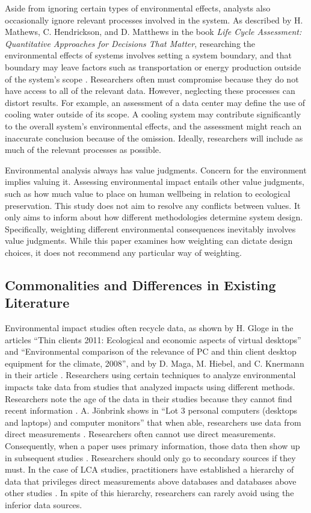 \documentclass[final,journal,10pt,letterpaper,oneside,twocolumn,compsoc]%
{IEEEtran}
\begin{document}
Aside from ignoring certain types of environmental effects, analysts also
occasionally ignore relevant processes involved in the system. As described by
H. Mathews, C. Hendrickson, and D. Matthews in the book \textit{Life Cycle
Assessment: Quantitative Approaches for Decisions That Matter}, researching the
environmental effects of systems involves setting a system boundary, and that
boundary may leave factors such as transportation or energy production outside
of
the system's scope \cite{textbook}. Researchers often must compromise because
they do not have access to all of the relevant data. However, neglecting
these processes can distort results. For example, an assessment of a data center
may define the use of cooling water outside of its scope. A cooling system may
contribute significantly to the overall system's environmental effects, and the
assessment might reach an inaccurate conclusion because of the omission.
Ideally, researchers will include as much of the relevant processes as possible.

Environmental analysis always has value judgments. Concern for the environment
implies valuing it. Assessing environmental impact entails other value
judgments, such as how much value to place on human wellbeing in relation to
ecological preservation. This study does not aim to resolve any conflicts
between values. It only aims to inform about how different methodologies
determine
system design. Specifically, weighting different environmental consequences
inevitably involves value judgments. While this paper examines
how weighting can dictate design choices, it does not recommend any particular
way of weighting.

\subsection{Commonalities and Differences in Existing Literature}
Environmental
impact studies often recycle data, as shown by H. Gloge in the articles ``Thin
clients 2011: Ecological and economic
aspects of virtual desktops'' and ``Environmental comparison of the relevance
of PC and thin client desktop equipment for the climate, 2008'', and by D. Maga,
M. Hiebel, and C. Knermann in their article \cite{client} \cite{desktop2}
\cite{maga}. Researchers using certain techniques to analyze environmental
impacts take data from studies that analyzed impacts using different
methods. Researchers note the age of the data in
their studies because they cannot find recent information \cite{maga}
\cite{client}. A. J{\"o}nbrink shows in ``Lot 3 personal computers
(desktops
and laptops) and computer monitors'' that when able, researchers use data from
direct measurements
\cite{desktop}. Researchers often cannot use direct measurements. Consequently,
when a paper uses primary information, those data then show up
in subsequent studies \cite{maga} \cite{desktop2}. Researchers should only
go to secondary sources if they must. In the case of LCA studies,
practitioners have established a
hierarchy of data that privileges direct measurements above databases and
databases above other studies \cite{textbook}. In spite of this hierarchy,
researchers can rarely avoid using the inferior data sources.
\end{document}

